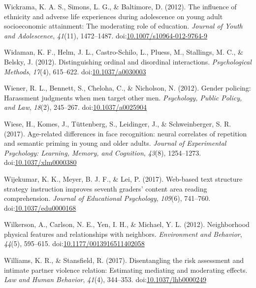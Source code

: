 \documentclass[english,man]{apa6}
\begin{document}
\hypertarget{ref-Wickrama2012}{}
Wickrama, K. A. S., Simons, L. G., \& Baltimore, D. (2012). The
influence of ethnicity and adverse life experiences during adolescence
on young adult socioeconomic attainment: The moderating role of
education. \emph{Journal of Youth and Adolescence}, \emph{41}(11),
1472--1487.
doi:\href{https://doi.org/10.1007/s10964-012-9764-9}{10.1007/s10964-012-9764-9}

\hypertarget{ref-Widaman2012}{}
Widaman, K. F., Helm, J. L., Castro-Schilo, L., Pluess, M., Stallings,
M. C., \& Belsky, J. (2012). Distinguishing ordinal and disordinal
interactions. \emph{Psychological Methods}, \emph{17}(4), 615--622.
doi:\href{https://doi.org/10.1037/a0030003}{10.1037/a0030003}

\hypertarget{ref-Wiener2012}{}
Wiener, R. L., Bennett, S., Cheloha, C., \& Nicholson, N. (2012). Gender
policing: Harassment judgments when men target other men.
\emph{Psychology, Public Policy, and Law}, \emph{18}(2), 245--267.
doi:\href{https://doi.org/10.1037/a0025904}{10.1037/a0025904}

\hypertarget{ref-Wiese2017}{}
Wiese, H., Komes, J., Tüttenberg, S., Leidinger, J., \& Schweinberger,
S. R. (2017). Age-related differences in face recognition: neural
correlates of repetition and semantic priming in young and older adults.
\emph{Journal of Experimental Psychology: Learning, Memory, and
Cognition}, \emph{43}(8), 1254--1273.
doi:\href{https://doi.org/10.1037/xlm0000380}{10.1037/xlm0000380}

\hypertarget{ref-Wijekumar2017}{}
Wijekumar, K. K., Meyer, B. J. F., \& Lei, P. (2017). Web-based text
structure strategy instruction improves seventh graders' content area
reading comprehension. \emph{Journal of Educational Psychology},
\emph{109}(6), 741--760.
doi:\href{https://doi.org/10.1037/edu0000168}{10.1037/edu0000168}

\hypertarget{ref-Wilkerson2012}{}
Wilkerson, A., Carlson, N. E., Yen, I. H., \& Michael, Y. L. (2012).
Neighborhood physical features and relationships with neighbors.
\emph{Environment and Behavior}, \emph{44}(5), 595--615.
doi:\href{https://doi.org/10.1177/0013916511402058}{10.1177/0013916511402058}

\hypertarget{ref-Williams2017}{}
Williams, K. R., \& Stansfield, R. (2017). Disentangling the risk
assessment and intimate partner violence relation: Estimating mediating
and moderating effects. \emph{Law and Human Behavior}, \emph{41}(4),
344--353.
doi:\href{https://doi.org/10.1037/lhb0000249}{10.1037/lhb0000249}
\end{document}

